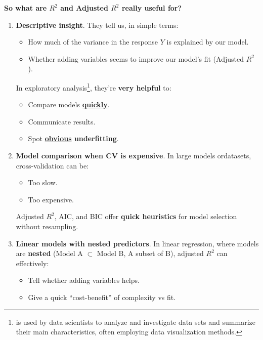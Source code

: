 \begin{flushleft}
    \textcolor{Green3}{ \textbf{So what are $R^2$ and Adjusted $R^2$ really useful for?}}
\end{flushleft}
\begin{enumerate}
    \item \textcolor{Green3}{\textbf{Descriptive insight}}. They tell us, in simple terms:
    \begin{itemize}
        \item How much of the variance in the response $Y$ is explained by our model.
        \item Whether adding variables seems to improve our model's fit (Adjusted $R^2$).
    \end{itemize}
    In exploratory analysis\footnote{ is used by data scientists to analyze and investigate data sets and summarize their main characteristics, often employing data visualization methods.\cite{ibmEDA}}, they're \textbf{very helpful} to:
    \begin{itemize}
        \item Compare models \underline{\textbf{quickly}}.
        \item Communicate results.
        \item Spot \textbf{\underline{obvious} underfitting}.
    \end{itemize}

    \item \textcolor{Green3}{\textbf{Model comparison when CV is expensive}}. In large models or\break datasets, cross-validation can be:
    \begin{itemize}[label=\textcolor{Red2}{}]
        \item Too slow.
        \item Too expensive.
    \end{itemize}
    Adjusted $R^2$, AIC, and BIC offer \textbf{quick heuristics} for model selection without resampling.

    \item \textcolor{Green3}{\textbf{Linear models with nested predictors}}. In linear regression, where models are \textbf{nested} (Model A $\subset$ Model B, A subset of B), adjusted $R^2$ can effectively:
    \begin{itemize}[label=\textcolor{Green3}{}]
        \item Tell whether adding variables helps.
        \item Give a quick ``cost-benefit'' of complexity vs fit.
    \end{itemize}
\end{enumerate}

